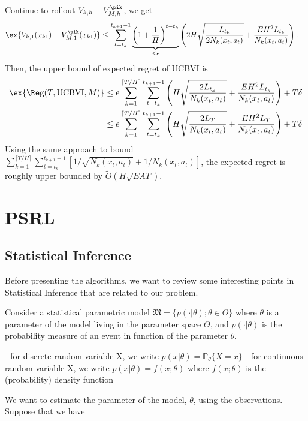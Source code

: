         Continue to rollout $V_{k,h}-V_{M,h}^{\pik}$, we get
        \begin{align*}
        \ex{V_{k,1}(x_{k1})-V_{M,1}^{\pik}(x_{k1})}
        &\le\sum_{t=t_k}^{t_{k+1}-1}\underbrace{\left(1+\frac1H\right)^{t-t_k}}_{\le e} \left(2H\sqrt{\frac{L_{t_k}}{2N_k(x_t,a_t)}} +\frac{EH^2L_{t_k}}{N_k(x_t,a_t)}\right).
        \end{align*}
        Then, the upper bound of expected regret of UCBVI is
        \begin{align*}
        \ex{\Reg(T,\mathrm{UCBVI},M)}
        &\le e\sum_{k=1}^{\lceil T/H\rceil}\sum_{t=t_k}^{t_{k+1}-1}  \left(H\sqrt{\frac{2L_{t_k}}{N_k(x_t,a_t)}} +\frac{EH^2L_{t_k}}{N_k(x_t,a_t)}\right) +T\delta \\
        &\le e\sum_{k=1}^{\lceil T/H\rceil}\sum_{t=t_k}^{t_{k+1}-1}  \left(H\sqrt{\frac{2L_T}{N_k(x_t,a_t)}} +\frac{EH^2L_T}{N_k(x_t,a_t)}\right) +T\delta
        \end{align*}
        Using the same approach to bound $\sum_{k=1}^{\lceil T/H\rceil}\sum_{t=t_k}^{t_{k+1}-1}[1/\sqrt{N_k(x_t,a_t)} +1/N_k(x_t,a_t)]$,
        the expected regret is roughly upper bounded by $\tilde{O}\left(H\sqrt{EAT}\right)$.
    
    \section{PSRL}
    \label{sec:psrl}
    
    \subsection{Statistical Inference}
    \label{subsec:statistical_inf}
    
    Before presenting the algorithms, we want to review some interesting points in Statistical Inference that are related to our problem.
    
    Consider a statistical parametric model $\mathfrak{M}=\{p(\cdot|\theta);\theta\in\Theta\}$ where $\theta$ is a parameter of the model living in the parameter space $\Theta$, and $p(\cdot|\theta)$ is the probability measure of an event in function of the parameter $\theta$.
    
    - for discrete random variable X, we write $p(x|\theta)=\mathbb{P}_{\theta}\{X=x\}$
    - for continuous random variable X, we write $p(x|\theta)=f(x;\theta)$ where $f(x;\theta)$ is the (probability) density function
    
    We want to estimate the parameter of the model, $\theta$, using the observations. Suppose that we have
    
